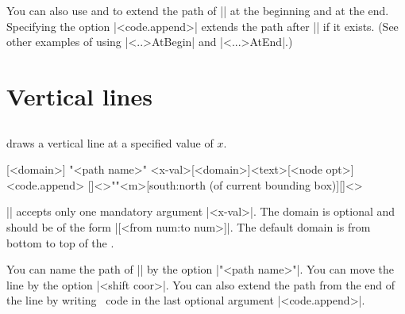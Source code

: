 You can also use \icmd{\tzhfnAtBegin} and \icmd{\tzhfnAtEnd} to extend the path of |\tzhfn| at the beginning and at the end. Specifying the option |<code.append>| extends the path after |\tzhfnAtEnd| if it exists.
(See other examples of using |\tz<..>AtBegin| and |\tz<...>AtEnd|.)


\section{Vertical lines}
\label{s:tzvfn}

\subsection{\protect\cmd{\tzvfnat}}
\label{ss:tzvfnat}

\icmd{\tzvfnat} draws a vertical line at a specified value of $x$.

\begin{tzdef}
[<domain>]
"<path name>"
        {<x-val>}[<domain>]{<text>}[<node opt>]<code.append>
  []<>""{<m>}[south:north (of current bounding box)]{}[]<>
\end{tzdef}

|\tzvfnat| accepts only one mandatory argument |{<x-val>}|.
The domain is optional and should be of the form |[<from num:to num>]|.
The default domain is from bottom to top of the .


\begin{tzcode}{.3}
{}
\end{tzcode}

You can name the path of |\tzvfnat| by the option |"<path name>"|.
You can move the line by the option |<shift coor>|.
You can also extend the path from the end of the line by writing \Tikz\ code in the last optional argument |<code.append>|.

\begin{tzcode}{.3}
\end{tzcode}

